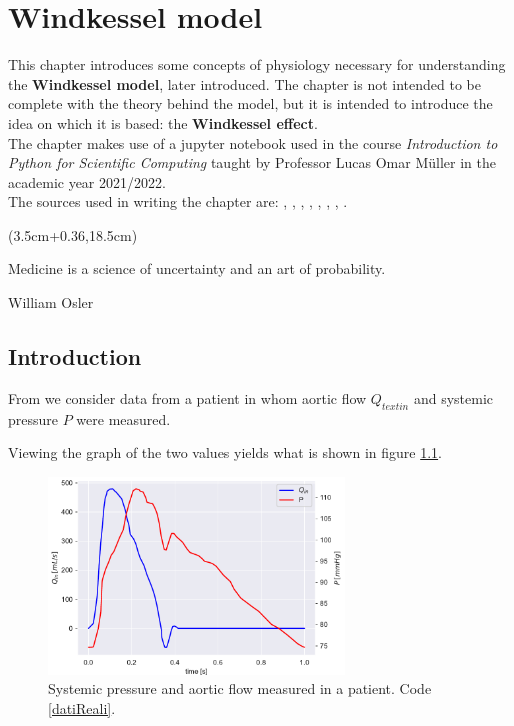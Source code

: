 \chapter{Windkessel model}\label{windkessel}
This chapter introduces some concepts of physiology necessary for understanding the \textbf{Windkessel model}, later introduced. The chapter is not intended to be complete with the theory behind the model, but it is intended to introduce the idea on which it is based: the \textbf{Windkessel effect}.\\
The chapter makes use of a jupyter notebook used in the course \textit{Introduction to Python for Scientific Computing} taught by Professor Lucas Omar Müller in the academic year 2021/2022.\\
The sources used in writing the chapter are: \cite{AaronsonPhilipI.PhilipIrving2020Tcsa}, \cite{wiki:Vascularresistance}, \cite{wiki:Compliance}, \cite{wiki:WindkesselEffect},
\cite{wiki:cicloCardiaco},
\cite{wiki:DiagrammaWiggers},
\cite{westerhof_arterial_2008}, \cite{ghitti_toro_müller_2022}. \\



\begin{textblock*}{0.64\textwidth}(3.5cm+0.36\textwidth,18.5cm)
\epigraph{Medicine is a science of uncertainty and an art of probability.}{William Osler}
\end{textblock*}




\newpage

\section{Introduction}
From \cite{westerhof_arterial_2008} we consider data from a patient in whom aortic flow $Q_{text{in}}$ and systemic pressure $P$ were measured.

Viewing the graph of the two values yields what is shown in figure \ref{figDatiReali}.

\begin{figure}[h]
    \centering
    \includegraphics[width=0.7\textwidth]{images/Windkessel/DatiReali.pdf}
    \caption{Systemic pressure and aortic flow measured in a patient. Code \ref{datiReali}.}
    \label{figDatiReali}
\end{figure}

